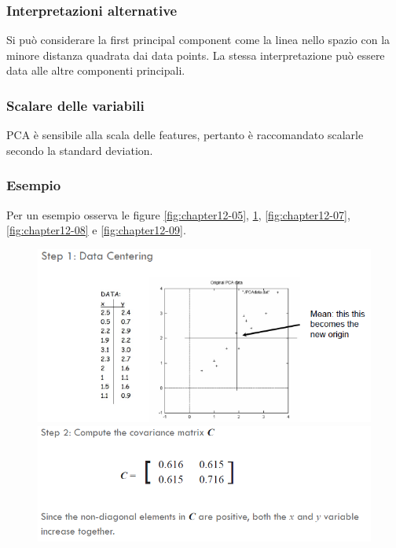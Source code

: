 \subsubsection{Interpretazioni alternative}
Si pu\`o considerare la first principal component come la linea nello spazio con la minore distanza quadrata dai data points.
La stessa interpretazione pu\`o essere data alle altre componenti principali.

\subsubsection{Scalare delle variabili}
PCA \`e sensibile alla scala delle features, pertanto \`e raccomandato scalarle secondo la standard deviation.

\subsubsection{Esempio}

Per un esempio osserva le figure \ref{fig:chapter12-05}, \ref{fig:chapter12-06}, \ref{fig:chapter12-07}, \ref{fig:chapter12-08} e \ref{fig:chapter12-09}.


\begin{figure}
	\centering
	\begin{minipage}{.5\textwidth}
		\centering
		\includegraphics[width=1\linewidth]{imgs/chapter12/img5}
		\caption{}
		\label{fig:chapter12-05}
	\end{minipage}%
	\begin{minipage}{.5\textwidth}
		\centering
		\includegraphics[width=1\linewidth]{imgs/chapter12/img6}
		\caption{}
		\label{fig:chapter12-06}
	\end{minipage}
\end{figure}

